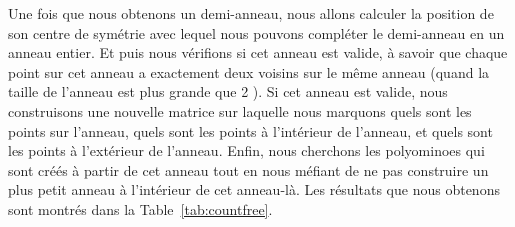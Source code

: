 \documentclass[a4paper,12pt]{article}
\begin{document}
	\par Une fois que nous obtenons un demi-anneau, nous allons calculer la position de son centre de symétrie avec lequel nous pouvons compléter le demi-anneau en un anneau entier. Et puis nous vérifions si cet anneau est valide, à savoir que chaque point sur cet anneau a exactement deux voisins sur le même anneau (quand la taille de l'anneau est plus grande que 2 ). Si cet anneau est valide, nous construisons une nouvelle matrice sur laquelle nous marquons quels sont les points sur l'anneau, quels sont les points à l'intérieur de l'anneau, et quels sont les points à l'extérieur de l'anneau. Enfin, nous cherchons les polyominoes qui sont créés à partir de cet anneau tout en nous méfiant de ne pas construire un plus petit anneau à l'intérieur de cet anneau-là. Les résultats que nous obtenons sont montrés dans la Table~\ref{tab:countfree}.
	
\end{document}
